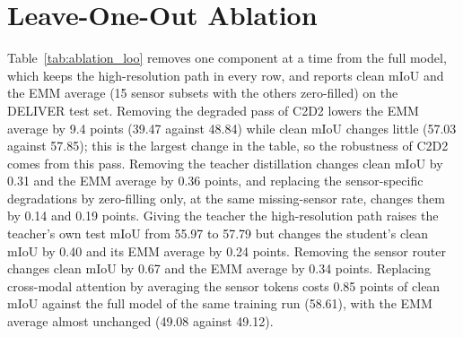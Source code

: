 \documentclass[10pt]{article}
\begin{document}
\section{Leave-One-Out Ablation}
\label{app:loo}
Table~\ref{tab:ablation_loo} removes one component at a time from the full model, which keeps the high-resolution path in every row, and reports clean mIoU and the EMM average (15 sensor subsets with the others zero-filled) on the DELIVER test set. Removing the degraded pass of C2D2 lowers the EMM average by 9.4 points (39.47 against 48.84) while clean mIoU changes little (57.03 against 57.85); this is the largest change in the table, so the robustness of C2D2 comes from this pass. Removing the teacher distillation changes clean mIoU by 0.31 and the EMM average by 0.36 points, and replacing the sensor-specific degradations by zero-filling only, at the same missing-sensor rate, changes them by 0.14 and 0.19 points. Giving the teacher the high-resolution path raises the teacher's own test mIoU from 55.97 to 57.79 but changes the student's clean mIoU by 0.40 and its EMM average by 0.24 points. Removing the sensor router changes clean mIoU by 0.67 and the EMM average by 0.34 points. Replacing cross-modal attention by averaging the sensor tokens costs 0.85 points of clean mIoU against the full model of the same training run (58.61), with the EMM average almost unchanged (49.08 against 49.12).
\end{document}
